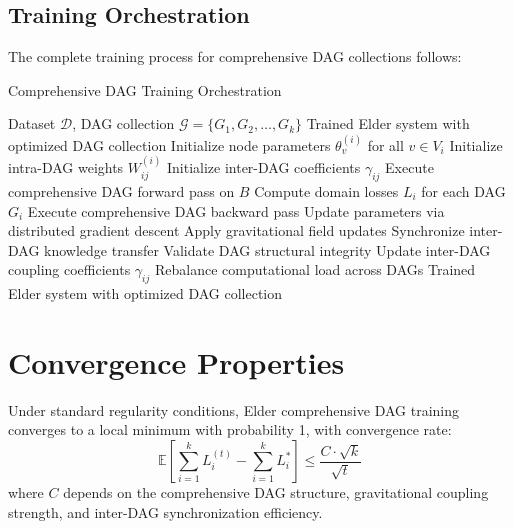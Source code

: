 \subsection{Training Orchestration}

The complete training process for comprehensive DAG collections follows:

\begin{algorithm}[H]
\caption{Comprehensive DAG Training Orchestration}
\begin{algorithmic}[1]
\REQUIRE Dataset $\mathcal{D}$, DAG collection $\mathcal{G} = \{G_1, G_2, \ldots, G_k\}$
\ENSURE Trained Elder system with optimized DAG collection
    \STATE Initialize node parameters $\theta_v^{(i)}$ for all $v \in V_i$
    \STATE Initialize intra-DAG weights $W_{ij}^{(i)}$
\ENDFOR
\STATE Initialize inter-DAG coefficients $\gamma_{ij}$
        \STATE Execute comprehensive DAG forward pass on $B$
        \STATE Compute domain losses $L_i$ for each DAG $G_i$
        \STATE Execute comprehensive DAG backward pass
        \STATE Update parameters via distributed gradient descent
        \STATE Apply gravitational field updates
        \STATE Synchronize inter-DAG knowledge transfer
    \ENDFOR
    \STATE Validate DAG structural integrity
    \STATE Update inter-DAG coupling coefficients $\gamma_{ij}$
    \STATE Rebalance computational load across DAGs
\ENDFOR
\RETURN Trained Elder system with optimized DAG collection
\end{algorithmic}
\end{algorithm}

\section{Convergence Properties}

\begin{theorem}
Under standard regularity conditions, Elder comprehensive DAG training converges to a local minimum with probability 1, with convergence rate:
\begin{equation}
\mathbb{E}\left[\sum_{i=1}^k L_i^{(t)} - \sum_{i=1}^k L_i^*\right] \leq \frac{C \cdot \sqrt{k}}{\sqrt{t}}
\end{equation}
where $C$ depends on the comprehensive DAG structure, gravitational coupling strength, and inter-DAG synchronization efficiency.
\end{theorem}

